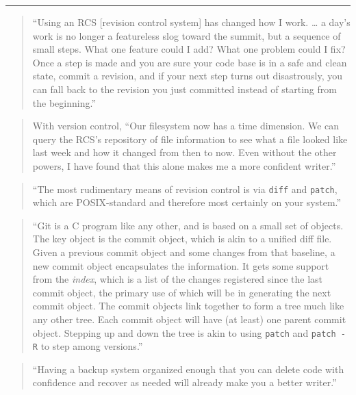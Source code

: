 \documentclass[]{tufte-book}
\begin{document}
\begin{center}\rule{0.5\linewidth}{0.5pt}\end{center}

\begin{quote}
``Using an RCS {[}revision control system{]} has changed how I work. \ldots{} a day's
work is no longer a featureless slog toward the summit, but a sequence of small
steps. What one feature could I add? What one problem could I fix? Once a step is
made and you are sure your code base is in a safe and clean state, commit a revision,
and if your next step turns out disastrously, you can fall back to the revision you
just committed instead of starting from the beginning.'' \citep{klemens201421st}
\end{quote}

\begin{quote}
With version control, ``Our filesystem now has a time dimension. We can query the
RCS's repository of file information to see what a file looked like last week and
how it changed from then to now. Even without the other powers, I have found that
this alone makes me a more confident writer.'' \citep{klemens201421st}
\end{quote}

\begin{quote}
``The most rudimentary means of revision control is via \texttt{diff} and \texttt{patch}, which
are POSIX-standard and therefore most certainly on your system.'' \citep{klemens201421st}
\end{quote}

\begin{quote}
``Git is a C program like any other, and is based on a small set of objects.
The key object is the commit object, which is akin to a unified diff file.
Given a previous commit object and some changes from that baseline, a new commit
object encapsulates the information. It gets some support from the \emph{index}, which
is a list of the changes registered since the last commit object, the primary
use of which will be in generating the next commit object. The commit objects
link together to form a tree much like any other tree. Each commit object will
have (at least) one parent commit object. Stepping up and down the tree is akin to
using \texttt{patch} and \texttt{patch\ -R} to step among versions.'' \citep{klemens201421st}
\end{quote}

\begin{quote}
``Having a backup system organized enough that you can delete code with confidence
and recover as needed will already make you a better writer.'' \citep{klemens201421st}
\end{quote}
\end{document}

